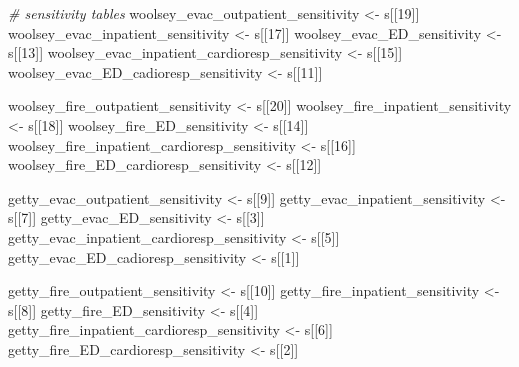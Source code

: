 \documentclass[
]{article}
\newenvironment{Shaded}{\begin{snugshade}}{\end{snugshade}}
\newcommand{\CommentTok}[1]{\textcolor[rgb]{0.56,0.35,0.01}{\textit{#1}}}
\newcommand{\DecValTok}[1]{\textcolor[rgb]{0.00,0.00,0.81}{#1}}
\newcommand{\NormalTok}[1]{#1}
\newcommand{\OtherTok}[1]{\textcolor[rgb]{0.56,0.35,0.01}{#1}}
\begin{document}
\begin{Shaded}
\begin{Highlighting}[]
\CommentTok{\# sensitivity tables}
\NormalTok{woolsey\_evac\_outpatient\_sensitivity }\OtherTok{\textless{}{-}}\NormalTok{ s[[}\DecValTok{19}\NormalTok{]]}
\NormalTok{woolsey\_evac\_inpatient\_sensitivity }\OtherTok{\textless{}{-}}\NormalTok{ s[[}\DecValTok{17}\NormalTok{]]}
\NormalTok{woolsey\_evac\_ED\_sensitivity }\OtherTok{\textless{}{-}}\NormalTok{ s[[}\DecValTok{13}\NormalTok{]]}
\NormalTok{woolsey\_evac\_inpatient\_cardioresp\_sensitivity }\OtherTok{\textless{}{-}}\NormalTok{ s[[}\DecValTok{15}\NormalTok{]]}
\NormalTok{woolsey\_evac\_ED\_cadioresp\_sensitivity }\OtherTok{\textless{}{-}}\NormalTok{ s[[}\DecValTok{11}\NormalTok{]]}

\NormalTok{woolsey\_fire\_outpatient\_sensitivity }\OtherTok{\textless{}{-}}\NormalTok{ s[[}\DecValTok{20}\NormalTok{]]}
\NormalTok{woolsey\_fire\_inpatient\_sensitivity }\OtherTok{\textless{}{-}}\NormalTok{ s[[}\DecValTok{18}\NormalTok{]]}
\NormalTok{woolsey\_fire\_ED\_sensitivity }\OtherTok{\textless{}{-}}\NormalTok{ s[[}\DecValTok{14}\NormalTok{]]}
\NormalTok{woolsey\_fire\_inpatient\_cardioresp\_sensitivity }\OtherTok{\textless{}{-}}\NormalTok{ s[[}\DecValTok{16}\NormalTok{]]}
\NormalTok{woolsey\_fire\_ED\_cardioresp\_sensitivity }\OtherTok{\textless{}{-}}\NormalTok{ s[[}\DecValTok{12}\NormalTok{]]}

\NormalTok{getty\_evac\_outpatient\_sensitivity }\OtherTok{\textless{}{-}}\NormalTok{ s[[}\DecValTok{9}\NormalTok{]]}
\NormalTok{getty\_evac\_inpatient\_sensitivity }\OtherTok{\textless{}{-}}\NormalTok{ s[[}\DecValTok{7}\NormalTok{]]}
\NormalTok{getty\_evac\_ED\_sensitivity }\OtherTok{\textless{}{-}}\NormalTok{ s[[}\DecValTok{3}\NormalTok{]]}
\NormalTok{getty\_evac\_inpatient\_cardioresp\_sensitivity }\OtherTok{\textless{}{-}}\NormalTok{ s[[}\DecValTok{5}\NormalTok{]]}
\NormalTok{getty\_evac\_ED\_cadioresp\_sensitivity }\OtherTok{\textless{}{-}}\NormalTok{ s[[}\DecValTok{1}\NormalTok{]]}

\NormalTok{getty\_fire\_outpatient\_sensitivity }\OtherTok{\textless{}{-}}\NormalTok{ s[[}\DecValTok{10}\NormalTok{]]}
\NormalTok{getty\_fire\_inpatient\_sensitivity }\OtherTok{\textless{}{-}}\NormalTok{ s[[}\DecValTok{8}\NormalTok{]]}
\NormalTok{getty\_fire\_ED\_sensitivity }\OtherTok{\textless{}{-}}\NormalTok{ s[[}\DecValTok{4}\NormalTok{]]}
\NormalTok{getty\_fire\_inpatient\_cardioresp\_sensitivity }\OtherTok{\textless{}{-}}\NormalTok{ s[[}\DecValTok{6}\NormalTok{]]}
\NormalTok{getty\_fire\_ED\_cardioresp\_sensitivity }\OtherTok{\textless{}{-}}\NormalTok{ s[[}\DecValTok{2}\NormalTok{]]}


\end{Highlighting}
\end{Shaded}
\end{document}

